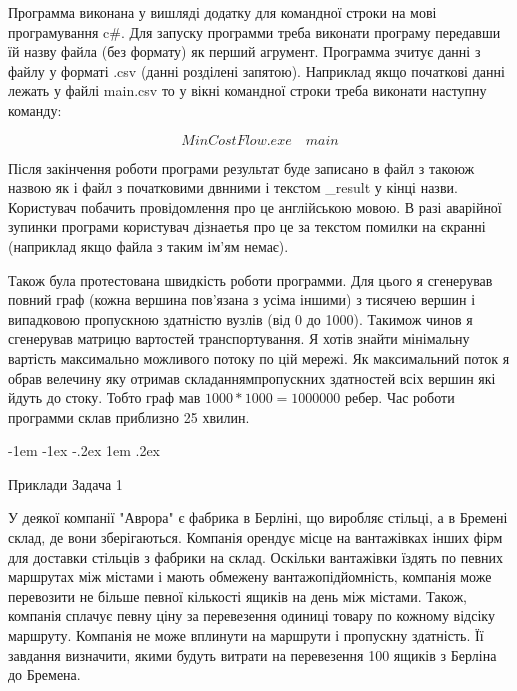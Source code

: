 \documentclass[a4paper,14pt,russian,ukrainian,oneside,final]{extreport}
\makeatletter
\newlength{\fivecharsapprox}
\newlength{\fivecharsapproxs}
\renewcommand\section{%
  \clearpage\@startsection {section}{0}%
    {\fivecharsapproxs}%
    {-1em \@plus -1ex \@minus -.2ex}%
    {1em \@plus .2ex}%
    {\raggedright\hyphenpenalty=10000\normalfont\large\bfseries\MakeUppercase {}}
}
\makeatother
\begin{document}
Программа виконана у вишляді додатку для командної строки на мові програмування c\#.
Для запуску программи треба виконати програму передавши їй назву файла (без формату) як перший агрумент. Программа зчитує данні з файлу у форматі .csv (данні розділені запятою).
Наприклад якщо початкові данні лежать у файлі main.csv то у вікні командної строки треба виконати наступну команду:

$$MinCostFlow.exe \quad main$$

Після закінчення роботи програми результат буде записано в файл з такоюж назвою як і файл з початковими двнними і текстом \_result у кінці назви.
Користувач побачить провідомлення про це англійською мовою.
В разі аварійної зупинки програми користувач дізнаетья про це за текстом помилки на єкранні (наприклад якщо файла з таким ім'ям немає).

Також була протестована швидкість роботи программи. Для цього я сгенерував повний граф (кожна вершина пов'язана з усіма іншими) з тисячею вершин і випадковою пропускною здатністю вузлів (від 0 до 1000).
Такимож чинов я сгенерував матрицю вартостей транспортування.
Я хотів знайти мінімальну вартість максимально можливого потоку по цій мережі.
Як максимальний поток я обрав велечину яку отримав складаннямпропускних здатностей всіх вершин які йдуть до стоку.
Тобто граф мав $1000*1000=1000000$ ребер.
Час роботи программи склав приблизно 25 хвилин.


\section{Приклади}
Задача 1

\indent У деякої компанії "Аврора" є фабрика в Берліні, що виробляє стільці, а в Бремені склад, де вони зберігаються. Компанія орендує місце на вантажівках інших фірм для доставки стільців з фабрики на склад. Оскільки вантажівки їздять по певних маршрутах між містами і мають обмежену вантажопідйомність, компанія може перевозити не більше певної кількості ящиків на день між містами. Також, компанія сплачує певну ціну за перевезення одиниці товару по кожному відсіку маршруту. Компанія не може вплинути на маршрути і пропускну здатність. Її завдання визначити, якими будуть витрати на перевезення 100 ящиків з Берліна до Бремена.
\end{document}
